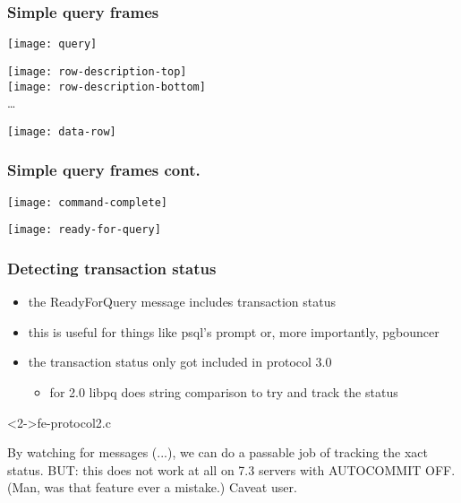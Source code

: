 \documentclass{beamer}
\begin{document}
\begin{frame}
  \frametitle{Simple query frames}

  \begin{center}
    \texttt{[image: query]}
  \end{center}

  \bigskip

  \hspace{0.4cm}\texttt{[image: row-description-top]}\;\raisebox{0.2cm}{$+$} \\
  \hspace{0.4cm}\texttt{[image: row-description-bottom]} \\
  \hspace{0.4cm}\dots

  \bigskip

  \begin{center}
    \texttt{[image: data-row]}
  \end{center}

\end{frame}

\begin{frame}
  \frametitle{Simple query frames cont.}

  \begin{center}
    \texttt{[image: command-complete]}
  \end{center}

  \bigskip

  \begin{center}
    \texttt{[image: ready-for-query]}
  \end{center}

\end{frame}

\begin{frame}[fragile]
  \frametitle{Detecting transaction status}

  \begin{itemize}
  \item the ReadyForQuery message includes transaction status
  \item this is useful for things like psql's prompt or, more importantly,
    pgbouncer
  \item the transaction status only got included in protocol 3.0
    \begin{itemize}
    \item for 2.0 libpq does string comparison to try and track the status
    \end{itemize}
  \end{itemize}

  \begin{block}<2->{fe-protocol2.c}
    \begin{semiverbatim}
    By watching for messages (...), we can do a passable
    job of tracking the xact status.  BUT: this does not
    work at all on 7.3 servers with AUTOCOMMIT OFF.
    (Man, was that feature ever a mistake.)  Caveat user.
    \end{semiverbatim}
  \end{block}
\end{frame}
\end{document}
